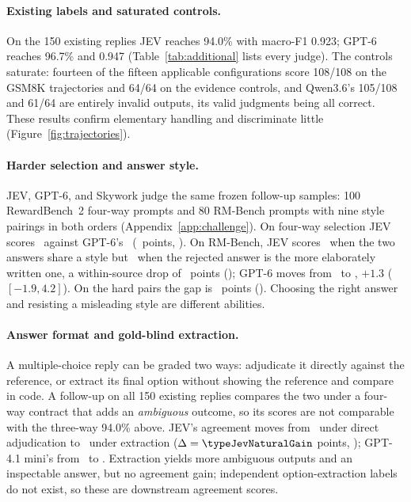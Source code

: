 \documentclass[11pt]{article}
\begin{document}
\paragraph{Existing labels and saturated controls.}
On the 150 existing replies JEV reaches 94.0\% with macro-F1 0.923; GPT-6 reaches 96.7\% and 0.947 (Table~\ref{tab:additional} lists every judge). The controls saturate: fourteen of the fifteen applicable configurations score 108/108 on the GSM8K trajectories and 64/64 on the evidence controls, and Qwen3.6's 105/108 and 61/64 are entirely invalid outputs, its valid judgments being all correct. These results confirm elementary handling and discriminate little (Figure~\ref{fig:trajectories}).

\paragraph{Harder selection and answer style.}
JEV, GPT-6, and Skywork judge the same frozen follow-up samples: 100 RewardBench~2 four-way prompts and 80 RM-Bench prompts with nine style pairings in both orders (Appendix~\ref{app:challenge}). On four-way selection JEV scores \revJevRBtwo\ against GPT-6's \revSixRBtwo\ (\revSixDeltaRBtwo\ points, \revSixCIRBtwo). On RM-Bench, JEV scores \revJevRMnormal\ when the two answers share a style but \revJevRMhard\ when the rejected answer is the more elaborately written one, a within-source drop of \revStyleDelta\ points (\revStyleCI); GPT-6 moves from \revSixRMnormal\ to \revSixRMhard, $+1.3$ ($[-1.9,4.2]$). On the hard pairs the gap is \revSixDeltaRMhard\ points (\revSixCIRMhard). Choosing the right answer and resisting a misleading style are different abilities.

\paragraph{Answer format and gold-blind extraction.}
A multiple-choice reply can be graded two ways: adjudicate it directly against the reference, or extract its final option without showing the reference and compare in code. A follow-up on all 150 existing replies compares the two under a four-way contract that adds an \emph{ambiguous} outcome, so its scores are not comparable with the three-way 94.0\% above. JEV's agreement moves from \typeJevNaturalDirect\ under direct adjudication to \typeJevNaturalExtract\ under extraction ($\Delta=\typeJevNaturalGain$ points, \typeJevNaturalGainCI); GPT-4.1 mini's from \typeMiniNaturalDirect\ to \typeMiniNaturalExtract. Extraction yields more ambiguous outputs and an inspectable answer, but no agreement gain; independent option-extraction labels do not exist, so these are downstream agreement scores.
\end{document}
